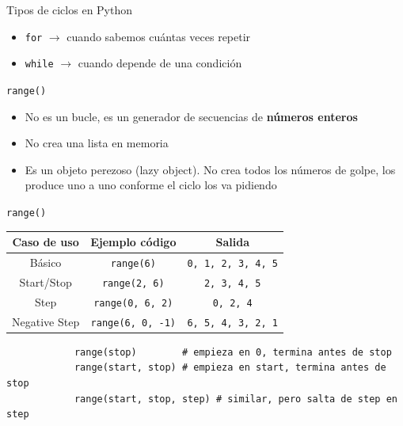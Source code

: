 \documentclass{beamer}
\begin{document}
    \begin{frame}[fragile,t]{Tipos de ciclos en Python}
        \begin{itemize}
            \item \texttt{for} $\rightarrow$ cuando sabemos cuántas veces repetir
            \item \texttt{while} $\rightarrow$ cuando depende de una condición
        \end{itemize}
    \end{frame}

    \begin{frame}{\texttt{range()}}
        \begin{itemize}
            \item No es un bucle, es un generador de secuencias de \textbf{números enteros}
            \item No crea una lista en memoria
            \item Es un objeto perezoso (lazy object). No crea todos los números de golpe, los produce uno a uno conforme el ciclo los va pidiendo
        \end{itemize}
    \end{frame}

    \begin{frame}[fragile,t]{\texttt{range()}}
        \centering
        \begin{tabular}{|c|c|c|}
            \hline
            Caso de uso & Ejemplo código & Salida \\
            \hline
            Básico & \texttt{range(6)} & \texttt{0, 1, 2, 3, 4, 5} \\
            \hline
            Start/Stop & \texttt{range(2, 6)} & \texttt{2, 3, 4, 5} \\
            \hline
            Step & \texttt{range(0, 6, 2)} & \texttt{0, 2, 4} \\
            \hline
            Negative Step & \texttt{range(6, 0, -1)} & \texttt{6, 5, 4, 3, 2, 1} \\
            \hline
        \end{tabular}
        
        \begin{verbatim}
            range(stop)        # empieza en 0, termina antes de stop
            range(start, stop) # empieza en start, termina antes de stop
            range(start, stop, step) # similar, pero salta de step en step 
        \end{verbatim}
    \end{frame}
\end{document}
